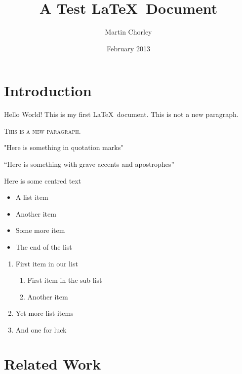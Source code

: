 \documentclass[12pt,twoside,a4paper]{article}
\title{A Test \LaTeX\ Document}
\author{Martin Chorley}
\date{February 2013}
\begin{document}
\maketitle

\begin{abstract}
\lipsum[2]
\end{abstract}

\section*{Introduction}
\onehalfspacing
{\Huge Hello World!} This is       my       first       \LaTeX\     document.
This is not a new paragraph.

\textsc{This is a new paragraph.}

"Here is something in quotation marks"

``Here is something with grave accents and apostrophes''

\begin{center}{\tiny Here is some centred text}\end{center}

\begin{itemize}
	\item A list item
	\item Another item
	\item Some more item
	\item The end of the list
\end{itemize}

\begin{enumerate}
	\item First item in our list
		\begin{enumerate}
			\item First item in the sub-list
			\item Another item
		\end{enumerate}
	\item Yet more list items
	\item And one for luck
\end{enumerate}


\lipsum[1-4]

\section{Related Work}
\singlespacing

\lipsum[5-6]
\end{document}
